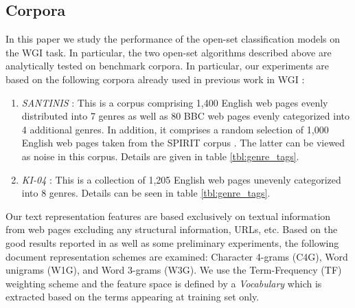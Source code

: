 \subsection{Corpora}\label{sec:corpora}
In this paper we study the performance of the open-set classification models on the WGI task. In particular, the two open-set algorithms described above are analytically tested on benchmark corpora. In particular, our experiments are based on the following corpora already used in previous work in WGI \citep{meyer2004genre,santini2007automatic,kanaris2009learning}:

\begin{enumerate}
\item \textit{SANTINIS} \citep{mehler2010genres_on_web}: This is a corpus comprising 1,400 English web pages evenly distributed into 7 genres as well as 80 BBC web pages evenly categorized into 4 additional genres. In addition, it comprises a random selection of 1,000 English web pages taken from the SPIRIT corpus \citep{joho2004spirit}. The latter can be viewed as noise in this corpus. Details are given in table \ref{tbl:genre_tags}.
\item \textit{KI-04} \citep{meyer2004genre}: This is a collection of 1,205 English web pages unevenly categorized into 8 genres. Details can be seen in table \ref{tbl:genre_tags}.
\end{enumerate}


Our text representation features are based exclusively on textual information from web pages excluding any structural information, URLs, etc. Based on the good results reported in \citep{sharoff2010web,pritsos2013open,Asheghi2015} as well as some preliminary experiments, the following document representation schemes are examined: Character 4-grams (C4G), Word unigrams (W1G), and Word 3-grams (W3G). We use the Term-Frequency (TF) weighting scheme  and the feature space is defined by a \textit{Vocabulary} which is extracted based on the terms appearing at training set only.

